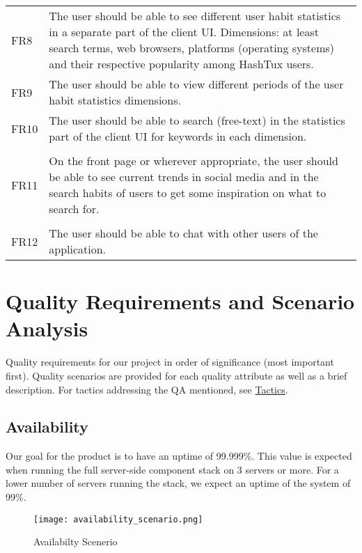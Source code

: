 {\tabulinesep=1.4mm
\begin{tabu}{|l|l|}
\hline
{}
 \\
\hline
\taburowcolors {}
FR8 & \parbox[t]{108mm}{The user should be able to see different user habit
   statistics in a separate part of the client UI. Dimensions: at least search
   terms, web browsers, platforms (operating systems) and their respective
   popularity among HashTux users.} \\
\hline
FR9 & \parbox[t]{108mm}{The user should be able to view different periods of the
   user habit statistics dimensions.} \\
\hline
FR10 & \parbox[t]{108mm}{The user should be able to search (free-text) in the
   statistics part of the client UI for keywords in each dimension.} \\
\hline
{}
  \\
\hline
\taburowcolors{}
FR11 & \parbox[t]{108mm}{On the front page or wherever appropriate, the user
   should be able to see current trends in social media and in the search habits
   of users to get some inspiration on what to search for.} \\
\hline
{}
   \\
\hline
\taburowcolors{}
FR12 & \parbox[t]{108mm}{The user should be able to chat with other users of the
   application.} \\
\hline
\end{tabu}}

\section{Quality Requirements and Scenario Analysis}
Quality requirements for our project in order of significance (most important
first). Quality scenarios are provided for each quality attribute as well as a
brief description. For tactics addressing the QA mentioned, see
\hyperlink{tactics}{Tactics}.

\subsection{Availability}
Our goal for the product is to have an uptime of 99.999\%. This value is
expected when running the full server-side component stack on 3 servers or more.
For a lower number of servers running the stack, we expect an uptime of the
system of 99\%.
\begin{figure}[ht]
  \centering
  \texttt{[image: availability\_scenario.png]}
  \caption{Availabilty Scenerio}
\end{figure}


